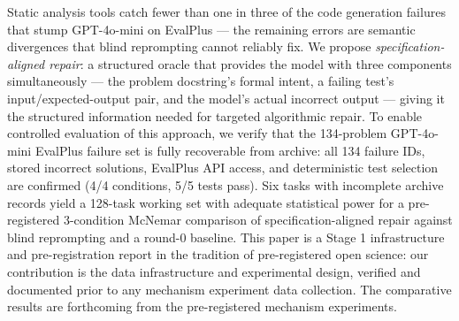 Static analysis tools catch fewer than one in three of the code generation failures
that stump GPT-4o-mini on EvalPlus --- the remaining errors are semantic divergences
that blind reprompting cannot reliably fix. We propose \textit{specification-aligned repair}:
a structured oracle that provides the model with three components simultaneously ---
the problem docstring's formal intent, a failing test's input/expected-output pair,
and the model's actual incorrect output --- giving it the structured information needed
for targeted algorithmic repair. To enable controlled evaluation of this approach,
we verify that the 134-problem GPT-4o-mini EvalPlus failure set is fully recoverable
from archive: all 134 failure IDs, stored incorrect solutions, EvalPlus API access,
and deterministic test selection are confirmed (4/4 conditions, 5/5 tests pass).
Six tasks with incomplete archive records yield a 128-task working set with adequate
statistical power for a pre-registered 3-condition McNemar comparison of specification-aligned
repair against blind reprompting and a round-0 baseline. This paper is a Stage 1
infrastructure and pre-registration report in the tradition of pre-registered open
science: our contribution is the data infrastructure and experimental design, verified
and documented prior to any mechanism experiment data collection. The comparative
results are forthcoming from the pre-registered mechanism experiments.
